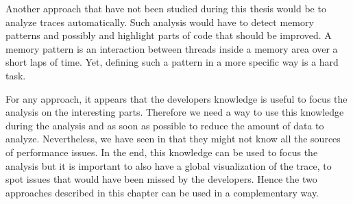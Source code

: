 Another approach that have not been studied during this thesis would be to analyze traces automatically.
Such analysis would have to detect memory patterns and possibly and highlight parts of code that should be improved.
A memory pattern is an interaction between threads inside a memory area over a short laps of time.
Yet, defining such a pattern in a more specific way is a hard task.

For any approach, it appears that the developers knowledge is useful to focus the analysis on the interesting parts.
Therefore we need a way to use this knowledge during the analysis and as soon as possible to reduce the amount of data to analyze.
Nevertheless, we have seen in  that they might not know all the sources of performance issues.
In the end, this knowledge can be used to focus the analysis but it is important to also have a global visualization of the trace, to spot issues that would have been missed by the developers.
Hence the two approaches described in this chapter can be used in a complementary way.
